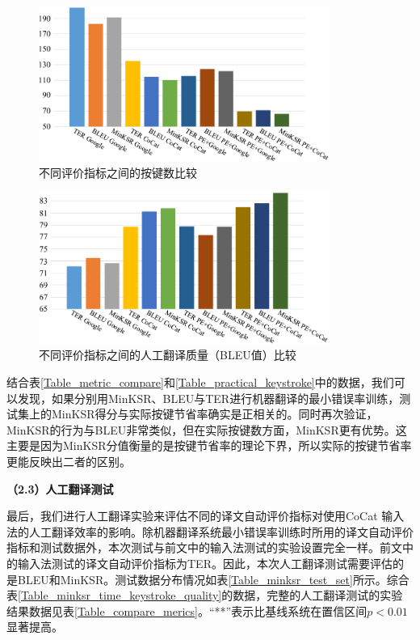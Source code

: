 \begin{figure}[!htb]
	\centering
	\includegraphics[width=0.85\textwidth]{Figure/Figure_3_11.pdf}
	\caption{不同评价指标之间的按键数比较}
	\label{Fig_metric_keysroke}
\end{figure}

\begin{figure}[!htb]
	\centering
	\includegraphics[width=0.85\textwidth]{Figure/Figure_3_12.pdf}
	\caption{不同评价指标之间的人工翻译质量（BLEU值）比较}
	\label{Fig_metric_quality}
\end{figure}

结合表\ref{Table_metric_compare}和\ref{Table_practical_keystroke}中的数据，我们可以发现，如果分别用MinKSR、BLEU与TER进行机器翻译的最小错误率训练，测试集上的MinKSR得分与实际按键节省率确实是正相关的。同时再次验证，MinKSR的行为与BLEU非常类似，但在实际按键数方面，MinKSR更有优势。这主要是因为MinKSR分值衡量的是按键节省率的理论下界，所以实际的按键节省率更能反映出二者的区别。

\textbf{（2.3）人工翻译测试}

最后，我们进行人工翻译实验来评估不同的译文自动评价指标对使用CoCat 输入法的人工翻译效率的影响。除机器翻译系统最小错误率训练时所用的译文自动评价指标和测试数据外，本次测试与前文中的输入法测试的实验设置完全一样。前文中的输入法测试的译文自动评价指标为TER。因此，本次人工翻译测试需要评估的是BLEU和MinKSR。测试数据分布情况如表\ref{Table_minksr_test_set}所示。综合表\ref{Table_minksr_time_keystroke_quality}的数据，完整的人工翻译测试的实验结果数据见表\ref{Table_compare_merics}。“**”表示比基线系统在置信区间$p<0.01$显著提高。

